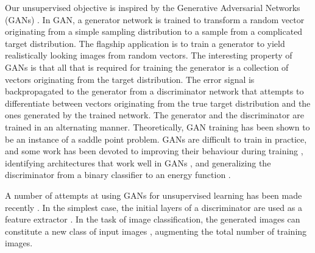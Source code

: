 \documentclass[a4paper]{article}
\begin{document}
Our unsupervised objective is inspired by the Generative Adversarial Networks (GANs) \cite{Goodfellow2014}. In GAN, a generator network is trained to transform a random vector originating from a simple sampling distribution to a sample from a complicated target distribution. The flagship application is to train a generator to yield realistically looking images from random vectors. The interesting property of GANs is that all that is required for training the generator is a collection of vectors originating from the target distribution. The error signal is backpropagated to the generator from a discriminator network that attempts to differentiate between vectors originating from the true target distribution and the ones generated by the trained network. The generator and the discriminator are trained in an alternating manner. Theoretically, GAN training has been shown to be an instance of a saddle point problem. GANs are difficult to train in practice, and some work has been devoted to improving their behaviour during training \cite{Salimans2016}, identifying architectures that work well in GANs \cite{Radford2015}, and generalizing the discriminator from a binary classifier to an energy function \cite{ebgan}.

A number of attempts at using GANs for unsupervised learning has been made recently \cite{Salimans2016,Radford2015}. In the simplest case, the initial layers of a discriminator are used as a feature extractor \cite{Radford2015}. In the task of image classification, the generated images can constitute a new class of input images \cite{Salimans2016}, augmenting the total number of training images.
\end{document}
